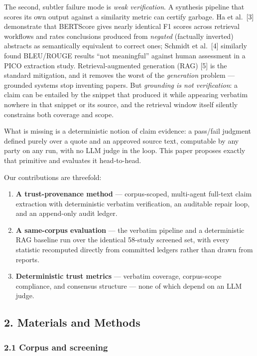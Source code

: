 \documentclass[11pt]{article}
\newcounter{none} %
\providecommand{\tightlist}{%
  \setlength{\itemsep}{0pt}\setlength{\parskip}{0pt}}
\begin{document}
The second, subtler failure mode is \emph{weak verification}. A
synthesis pipeline that scores its own output against a similarity
metric can certify garbage. Ha et al.~{[}3{]} demonstrate that BERTScore
gives nearly identical F1 scores across retrieval workflows and rates
conclusions produced from \emph{negated} (factually inverted) abstracts
as semantically equivalent to correct ones; Schmidt et al.~{[}4{]}
similarly found BLEU/ROUGE results ``not meaningful'' against human
assessment in a PICO extraction study. Retrieval-augmented generation
(RAG) {[}5{]} is the standard mitigation, and it removes the worst of
the \emph{generation} problem --- grounded systems stop inventing
papers. But \emph{grounding is not verification}: a claim can be
entailed by the snippet that produced it while appearing verbatim
nowhere in that snippet or its source, and the retrieval window itself
silently constrains both coverage and scope.

What is missing is a deterministic notion of claim evidence: a pass/fail
judgment defined purely over a quote and an approved source text,
computable by any party on any run, with no LLM judge in the loop. This
paper proposes exactly that primitive and evaluates it head-to-head.

Our contributions are threefold:

\begin{enumerate}
\def\labelenumi{\arabic{enumi}.}
\tightlist
\item
  \textbf{A trust-provenance method} --- corpus-scoped, multi-agent
  full-text claim extraction with deterministic verbatim verification,
  an auditable repair loop, and an append-only audit ledger.
\item
  \textbf{A same-corpus evaluation} --- the verbatim pipeline and a
  deterministic RAG baseline run over the identical 58-study screened
  set, with every statistic recomputed directly from committed ledgers
  rather than drawn from reports.
\item
  \textbf{Deterministic trust metrics} --- verbatim coverage,
  corpus-scope compliance, and consensus structure --- none of which
  depend on an LLM judge.
\end{enumerate}

\subsection{2. Materials and Methods}\label{materials-and-methods}

\subsubsection{2.1 Corpus and screening}\label{corpus-and-screening}
\end{document}
